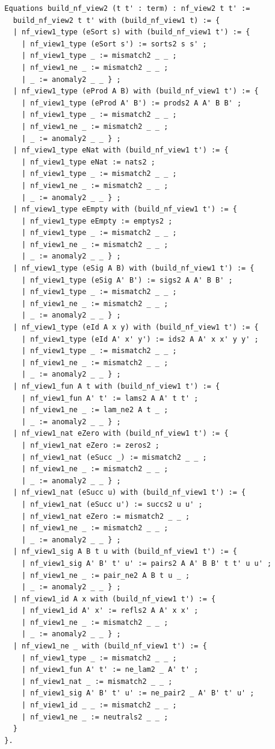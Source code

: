 \begin{lstlisting}
  Equations build_nf_view2 (t t' : term) : nf_view2 t t' :=
    build_nf_view2 t t' with (build_nf_view1 t) := {
    | nf_view1_type (eSort s) with (build_nf_view1 t') := {
      | nf_view1_type (eSort s') := sorts2 s s' ;
      | nf_view1_type _ := mismatch2 _ _ ;
      | nf_view1_ne _ := mismatch2 _ _ ;
      | _ := anomaly2 _ _ } ;
    | nf_view1_type (eProd A B) with (build_nf_view1 t') := {
      | nf_view1_type (eProd A' B') := prods2 A A' B B' ;
      | nf_view1_type _ := mismatch2 _ _ ;
      | nf_view1_ne _ := mismatch2 _ _ ;
      | _ := anomaly2 _ _ } ;
    | nf_view1_type eNat with (build_nf_view1 t') := {
      | nf_view1_type eNat := nats2 ;
      | nf_view1_type _ := mismatch2 _ _ ;
      | nf_view1_ne _ := mismatch2 _ _ ;
      | _ := anomaly2 _ _ } ;
    | nf_view1_type eEmpty with (build_nf_view1 t') := {
      | nf_view1_type eEmpty := emptys2 ;
      | nf_view1_type _ := mismatch2 _ _ ;
      | nf_view1_ne _ := mismatch2 _ _ ; 
      | _ := anomaly2 _ _ } ;
    | nf_view1_type (eSig A B) with (build_nf_view1 t') := {
      | nf_view1_type (eSig A' B') := sigs2 A A' B B' ;
      | nf_view1_type _ := mismatch2 _ _ ;
      | nf_view1_ne _ := mismatch2 _ _ ;
      | _ := anomaly2 _ _ } ;
    | nf_view1_type (eId A x y) with (build_nf_view1 t') := {
      | nf_view1_type (eId A' x' y') := ids2 A A' x x' y y' ;
      | nf_view1_type _ := mismatch2 _ _ ;
      | nf_view1_ne _ := mismatch2 _ _ ;
      | _ := anomaly2 _ _ } ;
    | nf_view1_fun A t with (build_nf_view1 t') := {
      | nf_view1_fun A' t' := lams2 A A' t t' ;
      | nf_view1_ne _ := lam_ne2 A t _ ; 
      | _ := anomaly2 _ _ } ;
    | nf_view1_nat eZero with (build_nf_view1 t') := {
      | nf_view1_nat eZero := zeros2 ;
      | nf_view1_nat (eSucc _) := mismatch2 _ _ ;
      | nf_view1_ne _ := mismatch2 _ _ ; 
      | _ := anomaly2 _ _ } ;
    | nf_view1_nat (eSucc u) with (build_nf_view1 t') := {
      | nf_view1_nat (eSucc u') := succs2 u u' ;
      | nf_view1_nat eZero := mismatch2 _ _ ;
      | nf_view1_ne _ := mismatch2 _ _ ; 
      | _ := anomaly2 _ _ } ;
    | nf_view1_sig A B t u with (build_nf_view1 t') := {
      | nf_view1_sig A' B' t' u' := pairs2 A A' B B' t t' u u' ;
      | nf_view1_ne _ := pair_ne2 A B t u _ ; 
      | _ := anomaly2 _ _ } ;
    | nf_view1_id A x with (build_nf_view1 t') := {
      | nf_view1_id A' x' := refls2 A A' x x' ;
      | nf_view1_ne _ := mismatch2 _ _ ;
      | _ := anomaly2 _ _ } ;
    | nf_view1_ne _ with (build_nf_view1 t') := {
      | nf_view1_type _ := mismatch2 _ _ ;
      | nf_view1_fun A' t' := ne_lam2 _ A' t' ;
      | nf_view1_nat _ := mismatch2 _ _ ;
      | nf_view1_sig A' B' t' u' := ne_pair2 _ A' B' t' u' ;
      | nf_view1_id _ _ := mismatch2 _ _ ;
      | nf_view1_ne _ := neutrals2 _ _ ;
    }
  }.


\end{lstlisting}
